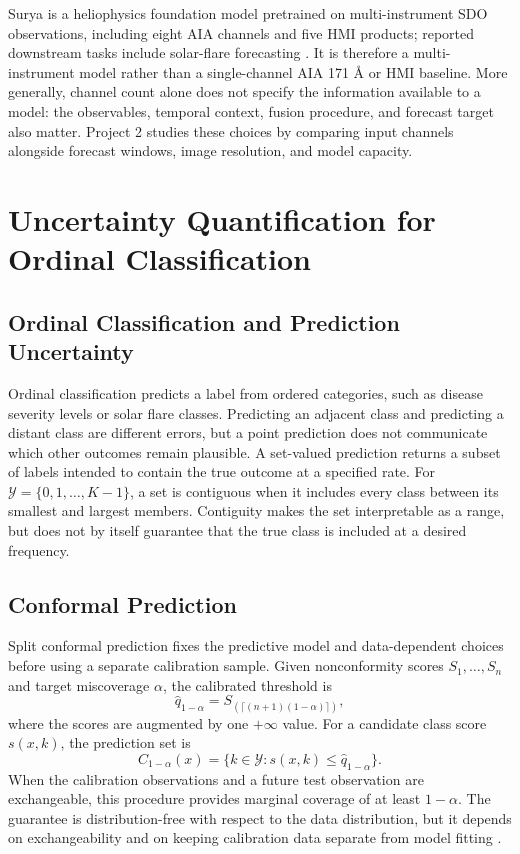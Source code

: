 \documentclass[12pt]{report}
\begin{document}
Surya is a heliophysics foundation model pretrained on multi-instrument SDO observations, including eight AIA channels and five HMI products; reported downstream tasks include solar-flare forecasting \citep{roy2025surya}. It is therefore a multi-instrument model rather than a single-channel AIA 171 \AA{} or HMI baseline. More generally, channel count alone does not specify the information available to a model: the observables, temporal context, fusion procedure, and forecast target also matter. Project 2 studies these choices by comparing input channels alongside forecast windows, image resolution, and model capacity.

\section{Uncertainty Quantification for Ordinal Classification}

\subsection{Ordinal Classification and Prediction Uncertainty}

Ordinal classification predicts a label from ordered categories, such as disease severity levels or solar flare classes. Predicting an adjacent class and predicting a distant class are different errors, but a point prediction does not communicate which other outcomes remain plausible. A set-valued prediction returns a subset of labels intended to contain the true outcome at a specified rate. For \(\mathcal{Y}=\{0,1,\ldots,K-1\}\), a set is contiguous when it includes every class between its smallest and largest members. Contiguity makes the set interpretable as a range, but does not by itself guarantee that the true class is included at a desired frequency.

\subsection{Conformal Prediction}

Split conformal prediction fixes the predictive model and data-dependent choices before using a separate calibration sample. Given nonconformity scores \(S_1,\ldots,S_n\) and target miscoverage \(\alpha\), the calibrated threshold is
\begin{equation}
  \widehat q_{1-\alpha}=S_{(\lceil(n+1)(1-\alpha)\rceil)},
\end{equation}
where the scores are augmented by one \(+\infty\) value. For a candidate class score \(s(x,k)\), the prediction set is
\begin{equation}
  C_{1-\alpha}(x)=\{k\in\mathcal{Y}:s(x,k)\leq\widehat q_{1-\alpha}\}.
\end{equation}
When the calibration observations and a future test observation are exchangeable, this procedure provides marginal coverage of at least \(1-\alpha\). The guarantee is distribution-free with respect to the data distribution, but it depends on exchangeability and on keeping calibration data separate from model fitting \citep{vovk1999cp,romano2020classification}.
\end{document}

